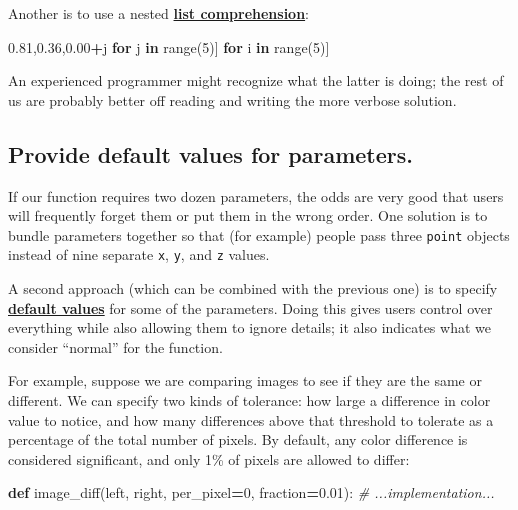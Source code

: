 \documentclass[
]{krantz}
\makeatletter
\newenvironment{Shaded}{\begin{snugshade}}{\end{snugshade}}
\newcommand{\BuiltInTok}[1]{#1}
\newcommand{\CommentTok}[1]{\textcolor[rgb]{0.56,0.35,0.01}{\textit{#1}}}
\newcommand{\ControlFlowTok}[1]{\textcolor[rgb]{0.13,0.29,0.53}{\textbf{#1}}}
\newcommand{\DecValTok}[1]{\textcolor[rgb]{0.00,0.00,0.81}{#1}}
\newcommand{\FloatTok}[1]{\textcolor[rgb]{0.00,0.00,0.81}{#1}}
\newcommand{\KeywordTok}[1]{\textcolor[rgb]{0.13,0.29,0.53}{\textbf{#1}}}
\newcommand{\NormalTok}[1]{#1}
\newcommand{\OperatorTok}[1]{\textcolor[rgb]{0.81,0.36,0.00}{\textbf{#1}}}
\newenvironment{kframe}{%
\medskip{}
\setlength{\fboxsep}{.8em}
 \def\at@end@of@kframe{}%
 \ifinner\ifhmode%
  \def\at@end@of@kframe{\end{minipage}}%
  \begin{minipage}{\columnwidth}%
 \fi\fi%
 \def\FrameCommand##1{\hskip\@totalleftmargin \hskip-\fboxsep
 \colorbox{shadecolor}{##1}\hskip-\fboxsep
     \hskip-\linewidth \hskip-\@totalleftmargin \hskip\columnwidth}%
 \MakeFramed {\advance\hsize-\width
   \@totalleftmargin\z@ \linewidth\hsize
   \@setminipage}}%
 {\par\unskip\endMakeFramed%
 \at@end@of@kframe}
\renewenvironment{Shaded}{\begin{kframe}}{\end{kframe}}
\newcommand{\gref}[2]{\hyperlink{#2}{\textbf{#1}}}
\makeatother
\begin{document}
Another is to use a nested \gref{list comprehension}{list\_comprehension}:

\begin{Shaded}
\begin{Highlighting}[]
\NormalTok{[[i}\OperatorTok{+}\NormalTok{j }\ControlFlowTok{for}\NormalTok{ j }\KeywordTok{in} \BuiltInTok{range}\NormalTok{(}\DecValTok{5}\NormalTok{)] }\ControlFlowTok{for}\NormalTok{ i }\KeywordTok{in} \BuiltInTok{range}\NormalTok{(}\DecValTok{5}\NormalTok{)]}
\end{Highlighting}
\end{Shaded}

An experienced programmer might recognize what the latter is doing;
the rest of us are probably better off reading and writing the more verbose solution.

\hypertarget{provide-default-values-for-parameters.}{%
\subsection{Provide default values for parameters.}\label{provide-default-values-for-parameters.}}

If our function requires two dozen parameters,
the odds are very good that users will frequently forget them
or put them in the wrong order.
One solution is to bundle parameters together so that (for example)
people pass three \texttt{point} objects instead of nine separate \texttt{x}, \texttt{y}, and \texttt{z} values.

A second approach (which can be combined with the previous one)
is to specify \gref{default values}{default\_value} for some of the parameters.
Doing this gives users control over everything
while also allowing them to ignore details;
it also indicates what we consider ``normal'' for the function.

For example,
suppose we are comparing images to see if they are the same or different.
We can specify two kinds of tolerance:
how large a difference in color value to notice,
and how many differences above that threshold to tolerate
as a percentage of the total number of pixels.
By default,
any color difference is considered significant,
and only 1\% of pixels are allowed to differ:

\begin{Shaded}
\begin{Highlighting}[]
\KeywordTok{def}\NormalTok{ image\_diff(left, right, per\_pixel}\OperatorTok{=}\DecValTok{0}\NormalTok{, fraction}\OperatorTok{=}\FloatTok{0.01}\NormalTok{):}
    \CommentTok{\# ...implementation...}
\end{Highlighting}
\end{Shaded}
\end{document}
